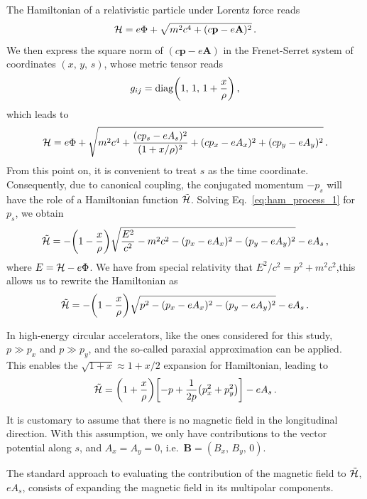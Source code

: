The Hamiltonian of a relativistic particle under Lorentz force reads
%
\begin{equation}
    \mathcal{H} = e\Phi + \sqrt{ m^2c^4 + (c\mathbf{p}-e\mathbf{A})^2 }\,. 
\end{equation}
%
We then express the square norm of $(c\mathbf{p}-e\mathbf{A})$ in the Frenet-Serret system of coordinates $(x,\,y,\,s)$, whose metric tensor reads
%
\begin{equation} 
    g_{ij} = \mathrm{diag}\qty(1,\,1,\,1+\frac{x}{\rho})\,, 
\end{equation}
%
which leads to
%
\begin{equation}
    \mathcal{H} = e\Phi + \sqrt{ m^2c^4 + \frac{(cp_s-eA_s)^2}{(1+x/\rho)^2 } + (cp_x-eA_x)^2+ (cp_y-eA_y)^2}\,.
    \label{eq:ham_process_1}
\end{equation}
%
From this point on, it is convenient to treat $s$ as the time coordinate. Consequently, due to canonical coupling, the conjugated momentum $-p_s$ will have the role of a Hamiltonian function $\tilde{\mathcal{H}}$. Solving Eq.~\eqref{eq:ham_process_1} for $p_s$, we obtain
%
\begin{equation} 
    \tilde{\mathcal{H}} = -\qty(1-\frac{x}{\rho})\sqrt{\frac{E^2}{c^2}-m^2c^2-(p_x-eA_x)^2-(p_y-eA_y)^2} - eA_s\,,
\end{equation}
%
where $E=\mathcal{H}-e\Phi$. We have from special relativity that $E^2/c^2 = p^2 + m^2c^2$,this allows us to rewrite the Hamiltonian as
\begin{equation}
    \tilde{\mathcal{H}} = -\qty(1-\frac{x}{\rho})\sqrt{p^2-(p_x-eA_x)^2-(p_y-eA_y)^2} - eA_s\,.
\end{equation}

In high-energy circular accelerators, like the ones considered for this study,  $p\gg p_x$ and $p\gg p_y$, and the so-called paraxial approximation can be applied. This enables the $\sqrt{1+x}\approx 1+x/2$ expansion for Hamiltonian, leading to
%
\begin{equation} 
	\tilde{\mathcal{H}} = \qty(1+\frac{x}{\rho})\qty[-p + \frac{1}{2p}\qty(p_x^2+p_y^2)] -eA_s\,. 
	\label{eq:hamem}
\end{equation}

It is customary to assume that there is no magnetic field in the longitudinal direction. With this assumption, we only have contributions to the vector potential along $s$, and $A_x=A_y=0$, i.e.\ $\mathbf{B}=(B_x,\,B_y,\,0)$.

The standard approach to evaluating the contribution of the magnetic field to $\tilde{\mathcal{H}}$, $eA_s$, consists of expanding the magnetic field in its multipolar components.

